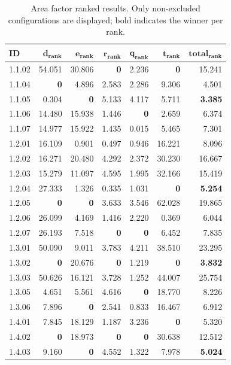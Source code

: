 \begin{table}[!t]
\centering
\footnotesize
\caption{Area factor ranked results. Only non-excluded configurations are displayed; bold indicates the winner per rank.}
\label{tab:area_ranked}
\begin{tabular}{@{}lrrrrrr@{}}
\hline
    \textbf{ID} & $\bm{d}_{\textbf{rank}}$ & $\bm{e}_{\textbf{rank}}$ & $\bm{r}_{\textbf{rank}}$ & $\bm{q}_{\textbf{rank}}$ & $\bm{t}_{\textbf{rank}}$ & $\textbf{total}_{\textbf{rank}}$ \\
\hline
    1.1.02 & 54.051 & 30.806 & \textbf{0} & 2.236 & \textbf{0} & 15.241 \\
    1.1.04 & \textbf{0} & 4.896 & 2.583 & 2.286 & 9.306 & 4.501 \\
    1.1.05 & 0.304 & \textbf{0} & 5.133 & 4.117 & 5.711 & \textbf{3.385} \\
    1.1.06 & 14.480 & 15.938 & 1.446 & \textbf{0} & 2.659 & 6.374 \\
    1.1.07 & 14.977 & 15.922 & 1.435 & 0.015 & 5.465 & 7.301 \\
    \noalign{\smallskip}
    1.2.01 & 16.109 & 0.901 & 0.497 & 0.946 & 16.221 & 8.096 \\
    1.2.02 & 16.271 & 20.480 & 4.292 & 2.372 & 30.230 & 16.667 \\
    1.2.03 & 15.279 & 11.097 & 4.595 & 1.995 & 32.166 & 15.419 \\
    1.2.04 & 27.333 & 1.326 & 0.335 & 1.031 & \textbf{0} & \textbf{5.254} \\
    1.2.05 & \textbf{0} & \textbf{0} & 3.633 & 3.546 & 62.028 & 19.865 \\
    1.2.06 & 26.099 & 4.169 & 1.416 & 2.220 & 0.369 & 6.044 \\
    1.2.07 & 26.193 & 7.518 & \textbf{0} & \textbf{0} & 6.452 & 7.835 \\
    \noalign{\smallskip}
    1.3.01 & 50.090 & 9.011 & 3.783 & 4.211 & 38.510 & 23.295 \\
    1.3.02 & \textbf{0} & 20.676 & \textbf{0} & 1.219 & \textbf{0} & \textbf{3.832} \\
    1.3.03 & 50.626 & 16.121 & 3.728 & 1.252 & 44.007 & 25.754 \\
    1.3.05 & 4.651 & 5.561 & 4.616 & \textbf{0} & 18.770 & 8.226 \\
    1.3.06 & 7.896 & \textbf{0} & 2.541 & 0.833 & 16.467 & 6.912 \\
    \noalign{\smallskip}
    1.4.01 & 7.845 & 18.129 & 1.187 & 3.236 & \textbf{0} & 5.320 \\
    1.4.02 & \textbf{0} & 18.973 & \textbf{0} & \textbf{0} & 30.638 & 12.512 \\
    1.4.03 & 9.160 & \textbf{0} & 4.552 & 1.322 & 7.978 & \textbf{5.024} \\
\hline
\end{tabular}
\end{table}